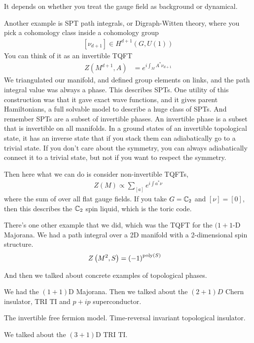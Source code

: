 It depends on whether you treat the gauge field as background or dynamical.

Another example is SPT path integrals, or Digraph-Witten theory,
where you pick a cohomology class inside a cohomology group
\begin{align}
    \left[ \nu_{d + 1} \right]
    \in
    H^{d + 1}
    \left( G, U(1) \right)
\end{align}
You can think of it as an invertible TQFT
\begin{align}
    Z\left( M^{d+1}, A \right)
    &=
    e^{i\int_M A^* \nu_{d+1}}
\end{align}
We triangulated our manifold,
and defined group elements on links,
and the path integral value was always a phase.
This describes SPTs.
One utility of this construction was that it gave exact wave functions,
and it gives parent Hamiltonians,
a full solvable model to describe a huge class of SPTs.
And remember SPTs are a subset of invertible phases.
An invertible phase is a subset that is invertible on all manifolds.
In a ground states of an invertible topological state,
it has an inverse state that if you stack them can adiabatically go to a trivial
state.
If you don't care about the symmetry,
you can always adiabatically connect it to a trivial state,
but not if you want to respect the symmetry.

Then here what we can do is consider non-invertible TQFTs,
\begin{align}
    Z(M) \propto
    \sum_{[a]} e^{i \int a^* \nu}
\end{align}
where the sum of over all flat gauge fields.
If you take $G=\mathbb{C}_2$ and $[\nu] = [0]$,
then this describes the $\mathbb{C}_2$ spin liquid,
which is the toric code.

There's one other example that we did,
which was the TQFT for the $(1+1$-D Majorana.
We had a path integral over a 2D manifold with a 2-dimensional spin structure.
\begin{align}
    Z\left( M^2, S \right) &=
    \left( -1 \right)^{\operatorname{poly}(S)}
\end{align}

And then we talked about concrete examples of topological phases.

We had the $(1+1)$D Majorana.
Then we talked about the $(2+1)D$ Chern insulator,
TRI TI and $p+ip$ superconductor.

The invertible free fermion model.
Time-reversal invariant topological insulator.

We talked about the $(3+1)$D TRI TI.

